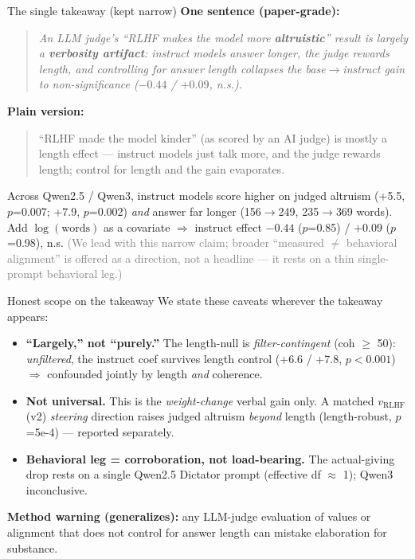 \documentclass[aspectratio=169,11pt]{beamer}
\begin{document}
\begin{frame}{The single takeaway (kept narrow)}
  \textbf{One sentence (paper-grade):}
  \begin{quote}
    \itshape An LLM judge's ``RLHF makes the model more \textbf{altruistic}'' result is largely a
    \textbf{verbosity artifact}: instruct models answer longer, the judge rewards length, and
    controlling for answer length collapses the base$\rightarrow$instruct gain to non-significance
    ($-0.44$ / $+0.09$, n.s.).
  \end{quote}

  \vspace{0.3em}
  \textbf{Plain version:}
  \begin{quote}
    ``RLHF made the model kinder'' (as scored by an AI judge) is mostly a length effect --- instruct
    models just talk more, and the judge rewards length; control for length and the gain evaporates.
  \end{quote}

  \vspace{0.3em}
  \footnotesize
  Across Qwen2.5 / Qwen3, instruct models score higher on judged altruism (+5.5, $p$=0.007;
  +7.9, $p$=0.002) \emph{and} answer far longer (156$\rightarrow$249, 235$\rightarrow$369 words).
  Add $\log(\text{words})$ as a covariate $\Rightarrow$ instruct effect $-0.44$ ($p$=0.85) / $+0.09$
  ($p$=0.98), n.s. \;\textcolor{gray}{(We lead with this narrow claim; broader ``measured $\neq$ behavioral
  alignment'' is offered as a direction, not a headline --- it rests on a thin single-prompt behavioral leg.)}
\end{frame}

\begin{frame}{Honest scope on the takeaway}
  We state these caveats wherever the takeaway appears:
  \begin{itemize}
    \item \textbf{``Largely,'' not ``purely.''} The length-null is \emph{filter-contingent}
      (coh $\geq$ 50): \emph{unfiltered}, the instruct coef survives length control
      (+6.6 / +7.8, $p<0.001$) $\Rightarrow$ confounded jointly by length \emph{and} coherence.
    \item \textbf{Not universal.} This is the \emph{weight-change} verbal gain only. A matched
      $v_\text{RLHF}$(v2) \emph{steering} direction raises judged altruism \emph{beyond} length
      (length-robust, $p$=5e-4) --- reported separately.
    \item \textbf{Behavioral leg = corroboration, not load-bearing.} The actual-giving drop
      rests on a single Qwen2.5 Dictator prompt (effective df $\approx$ 1); Qwen3 inconclusive.
  \end{itemize}

  \vspace{0.4em}
  \footnotesize
  \textbf{Method warning (generalizes):} any LLM-judge evaluation of values or alignment that
  does not control for answer length can mistake elaboration for substance.
\end{frame}
\end{document}
